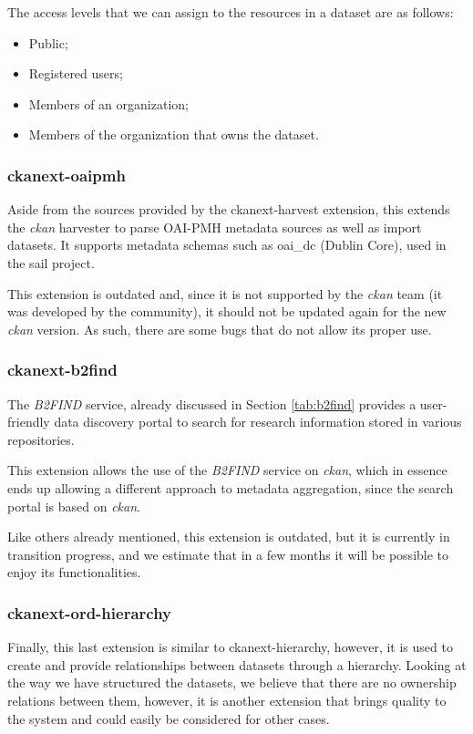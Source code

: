   The access levels that we can assign to the resources in a dataset are as follows:
  
  \begin{itemize}
      \item Public;
      \item Registered users;
      \item Members of an organization;
      \item Members of the organization that owns the dataset.
  \end{itemize}
  
  \subsubsection{ckanext-oaipmh}
  
  Aside from the sources provided by the ckanext-harvest extension, this extends the \textit{\gls{ckan}} harvester to parse OAI-PMH metadata sources as well as import datasets. It supports metadata schemas such as oai\_dc (Dublin Core), used in the \gls{sail} project.
  
  This extension is outdated and, since it is not supported by the \textit{\gls{ckan}} team (it was developed by the community), it should not be updated again for the new \textit{\gls{ckan}} version. As such, there are some bugs that do not allow its proper use.
  
  \subsubsection{ckanext-b2find}
  
   The \textit{B2FIND} service, already discussed in Section \ref{tab:b2find} provides a user-friendly data discovery portal to search for research information stored in various repositories.
 
   This extension allows the use of the \textit{B2FIND} service on \textit{\gls{ckan}}, which in essence ends up allowing a different approach to metadata aggregation, since the search portal is based on \textit{\gls{ckan}}. 
   
   Like others already mentioned, this extension is outdated, but it is currently in transition progress, and we estimate that in a few months it will be possible to enjoy its functionalities. 
  
  \subsubsection{ckanext-ord-hierarchy}
  
  Finally, this last extension is similar to ckanext-hierarchy, however, it is used to create and provide relationships between datasets through a hierarchy. Looking at the way we have structured the datasets, we believe that there are no ownership relations between them, however, it is another extension that brings quality to the system and could easily be considered for other cases.

  \newpage